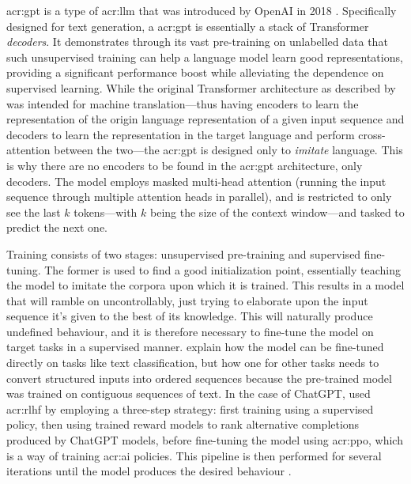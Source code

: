\gls{acr:gpt} is a type of \gls{acr:llm} that was introduced by OpenAI in 2018 \citep{radfordImprovingLanguageUnderstanding2018}. Specifically designed for text generation, a \acrshort{acr:gpt} is essentially a stack of Transformer \textit{decoders}. It demonstrates through its vast pre-training on unlabelled data that such unsupervised training can help a language model learn good representations, providing a significant performance boost while alleviating the dependence on supervised learning. While the original Transformer architecture as described by \cite{vaswaniAttentionAllYou2017} was intended for machine translation---thus having encoders to learn the representation of the origin language representation of a given input sequence and decoders to learn the representation in the target language and perform cross-attention between the two---the \acrshort{acr:gpt} is designed only to \textit{imitate} language. This is why there are no encoders to be found in the \acrshort{acr:gpt} architecture, only decoders. The model employs masked multi-head attention (running the input sequence through multiple attention heads in parallel), and is restricted to only see the last $k$ tokens---with $k$ being the size of the context window---and tasked to predict the next one.

Training consists of two stages: unsupervised pre-training and supervised fine-tuning. The former is used to find a good initialization point, essentially teaching the model to imitate the corpora upon which it is trained. This results in a model that will ramble on uncontrollably, just trying to elaborate upon the input sequence it's given to the best of its knowledge. This will naturally produce undefined behaviour, and it is therefore necessary to fine-tune the model on target tasks in a supervised manner. \cite[4]{radfordImprovingLanguageUnderstanding2018} explain how the model can be fine-tuned directly on tasks like text classification, but how one for other tasks needs to convert structured inputs into ordered sequences because the pre-trained model was trained on contiguous sequences of text. In the case of ChatGPT, \citeauthor{openaiIntroducingChatGPT2022} used \gls{acr:rlhf} by employing a three-step strategy: first training using a supervised policy, then using trained reward models to rank alternative completions produced by ChatGPT models, before fine-tuning the model using \gls{acr:ppo}, which is a way of training \acrshort{acr:ai} policies. This pipeline is then performed for several iterations until the model produces the desired behaviour \citep{openaiIntroducingChatGPT2022}.

